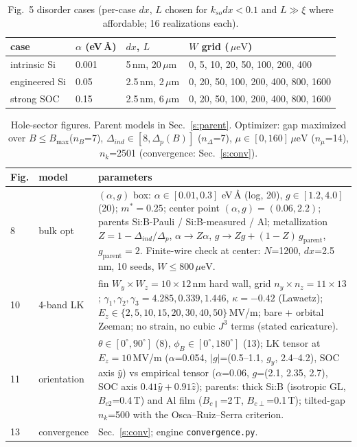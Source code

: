 \documentclass[11pt]{article}
\newcommand{\ueV}{\,\mu\mathrm{eV}}
\begin{document}
\begin{table}[h]\centering\scriptsize
\caption{Fig.~5 disorder cases (per-case $dx$, $L$ chosen for
$k_{so}dx < 0.1$ and $L \gg \xi$ where affordable; 16 realizations each).}
\label{t:par-f5}
\begin{tabular}{llll}
\toprule
case & $\alpha$ (eV\,\AA) & $dx$, $L$ & $W$ grid ($\ueV$)\\
\midrule
intrinsic Si & 0.001 & 5\,nm, 20\,$\mu$m & 0, 5, 10, 20, 50, 100, 200, 400\\
engineered Si & 0.05 & 2.5\,nm, 2\,$\mu$m & 0, 20, 50, 100, 200, 400, 800, 1600\\
strong SOC & 0.15 & 2.5\,nm, 6\,$\mu$m & 0, 20, 50, 100, 200, 400, 800, 1600\\
\bottomrule
\end{tabular}
\end{table}

\begin{table}[h]\centering\scriptsize
\caption{Hole-sector figures. Parent models in Sec.~\ref{s:parent}.
Optimizer: gap maximized over $B \le B_{\max}$($n_B$=7), $\Delta_{ind}
\in [8, \Delta_p(B)]$ ($n_\Delta$=7), $\mu \in [0,160]\ueV$ ($n_\mu$=14),
$n_k$=2501 (convergence: Sec.~\ref{s:conv}).}
\label{t:par-h}
\begin{tabular}{llp{10.5cm}}
\toprule
Fig. & model & parameters\\
\midrule
8 & bulk opt & $(\alpha, g)$ box: $\alpha \in [0.01, 0.3]$ eV\,\AA{}
(log, 20), $g \in [1.2, 4.0]$ (20); $m^* = 0.25$; center point
$(\alpha, g) = (0.06, 2.2)$; parents Si:B-Pauli / Si:B-measured / Al;
metallization $Z = 1 - \Delta_{ind}/\Delta_p$, $\alpha \to Z\alpha$,
$g \to Zg + (1{-}Z)\,g_{\mathrm{parent}}$, $g_{\mathrm{parent}}=2$.
Finite-wire check at center: $N$=1200, $dx$=2.5\,nm, 10 seeds,
$W \le 800\ueV$.\\
10 & 4-band LK & fin $W_y{\times}W_z = 10{\times}12$\,nm hard wall, grid
$n_y{\times}n_z = 11{\times}13$; $\gamma_1, \gamma_2, \gamma_3 = 4.285,
0.339, 1.446$, $\kappa = -0.42$ (Lawaetz); $E_z \in \{2,5,10,15,20,30,40,
50\}$\,MV/m; bare + orbital Zeeman; no strain, no cubic $J^3$ terms
(stated caricature).\\
11 & orientation & $\theta \in [0^\circ, 90^\circ]$ (8), $\phi_B \in
[0^\circ, 180^\circ]$ (13); LK tensor at $E_z = 10$\,MV/m
($\alpha$=0.054, $|g|$=(0.5--1.1, $g_y$, 2.4--4.2), SOC axis $\hat y$) vs
empirical tensor ($\alpha$=0.06, $g$=(2.1, 2.35, 2.7), SOC axis
$0.41\hat y + 0.91\hat z$); parents: thick Si:B (isotropic GL,
$B_{c2}$=0.4\,T) and Al film ($B_{c\parallel}$=2\,T,
$B_{c\perp}$=0.1\,T); tilted-gap $n_k$=500 with the
Osca--Ruiz--Serra criterion.\\
13 & convergence & Sec.~\ref{s:conv}; engine \texttt{convergence.py}.\\
\bottomrule
\end{tabular}
\end{table}
\end{document}
